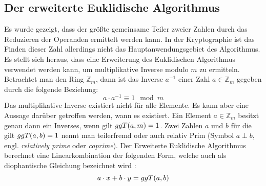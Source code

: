 \subsection{Der erweiterte Euklidische Algorithmus}
Es wurde gezeigt, dass der größte gemeinsame Teiler zweier Zahlen durch
das Reduzieren der Operanden ermittelt werden kann. In der Kryptographie ist
das Finden dieser Zahl allerdings nicht das Hauptanwendungsgebiet des
Algorithmus. Es stellt sich heraus, dass eine Erweiterung des Euklidischen Algorithmus
verwendet werden kann, um multiplikative Inverse modulo $m$ zu ermitteln.
Betrachtet man den Ring $\mathbb{Z}_m$, dann ist das Inverse $a^{-1}$
einer Zahl $a \in \mathbb{Z}_m$ gegeben durch die folgende Beziehung:
\begin{equation}
  \label{eq:inverse}
  a \cdot a^{-1} \equiv 1 \mod{m}
\end{equation}
Das multiplikative Inverse existiert nicht für alle Elemente. Es kann aber eine Aussage
darüber getroffen werden, wann es existiert. Ein Element
$a \in \mathbb{Z}_m$ besitzt genau dann ein Inverses, wenn gilt $ggT(a,m) = 1$.
Zwei Zahlen $a$ und $b$ für die gilt $ggT(a,b) = 1$ nennt man teilerfremd oder auch
relativ Prim (Symbol $a \perp b$, engl. \textit{relatively prime} oder \textit{coprime}).
Der Erweiterte Euklidische Algorithmus berechnet eine Linearkombination der folgenden Form,
welche auch als diophantische Gleichung
bezeichnet wird \parencite[160]{BOOK:crypto} \parencite{SITE:diophant}:
\begin{equation*}
  a \cdot x + b \cdot y = ggT(a,b)
\end{equation*}

